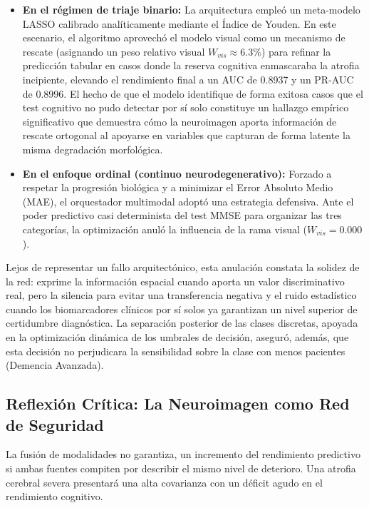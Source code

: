 \documentclass[12pt, oneside, english, spanish]{book}
\begin{document}
\begin{itemize}
	\item \textbf{En el régimen de triaje binario:} La arquitectura empleó un meta-modelo LASSO calibrado analíticamente mediante el Índice de Youden. En este escenario, el algoritmo aprovechó el modelo visual como un mecanismo de rescate (asignando un peso relativo visual $W_{vis} \approx 6.3\%$) para refinar la predicción tabular en casos donde la reserva cognitiva enmascaraba la atrofia incipiente, elevando el rendimiento final a un AUC de 0.8937 y un PR-AUC de 0.8996. El hecho de que el modelo identifique de forma exitosa casos que el test cognitivo no pudo detectar por sí solo constituye un hallazgo empírico significativo que demuestra cómo la neuroimagen aporta información de rescate ortogonal al apoyarse en variables que capturan de forma latente la misma degradación morfológica.
	\item \textbf{En el enfoque ordinal (continuo neurodegenerativo):} Forzado a respetar la progresión biológica y a minimizar el Error Absoluto Medio (MAE), el orquestador multimodal adoptó una estrategia defensiva. Ante el poder predictivo casi determinista del test MMSE para organizar las tres categorías, la optimización anuló la influencia de la rama visual ($W_{vis}= 0.000$). 
\end{itemize}

Lejos de representar un fallo arquitectónico, esta anulación constata la solidez de la red: exprime la información espacial cuando aporta un valor discriminativo real, pero la silencia para evitar una transferencia negativa y el ruido estadístico cuando los biomarcadores clínicos por sí solos ya garantizan un nivel superior de certidumbre diagnóstica. La separación posterior de las clases discretas, apoyada en la optimización dinámica de los umbrales de decisión, aseguró, además, que esta decisión no perjudicara la sensibilidad sobre la clase con menos pacientes (Demencia Avanzada).

\subsection{Reflexión Crítica: La Neuroimagen como Red de Seguridad} \label{subsec:reflexion_critica}

La fusión de modalidades no garantiza, un incremento del rendimiento predictivo si ambas fuentes compiten por describir el mismo nivel de deterioro. Una atrofia cerebral severa presentará una alta covarianza con un déficit agudo en el rendimiento cognitivo.
\end{document}
